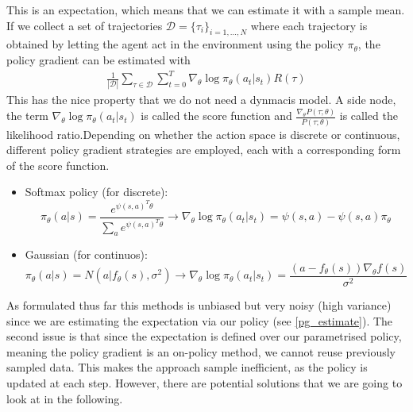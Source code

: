 This is an expectation, which means that we can estimate it with a sample mean. If we collect a set
of trajectories $\mathcal{D} = \{\tau_i\}_{i=1,...,N}$ where each trajectory is obtained by letting
the agent act in the environment using the policy $\pi_{\theta}$, the policy gradient can be estimated with
\begin{align} 
    \frac{1}{|\mathcal{D}|} \sum_{\tau \in \mathcal{D}} \sum_{t=0}^{T} \nabla_{\theta} 
    \log \pi_{\theta}(a_t |s_t) R(\tau) \label{pg_estimate}
\end{align}
This has the nice property that we do not need a dynmacis model. 
A side node, the term $\nabla_{\theta}\log{\pi_{\theta}(a_t|s_t)}$ is called 
the score function and $\frac{\nabla_{\theta} P(\tau;\theta)}{P(\tau;\theta)}$ 
is called the likelihood ratio.\newline Depending on whether the action space is discrete or continuous,
different policy gradient strategies are employed, each with a corresponding form of the score function.
\begin{itemize}
    \item Softmax policy (for discrete): 
    $$\pi_{\theta}(a|s)= \frac{e^{\psi(s,a)^T \theta}}{\sum_{a} e^{\psi(s,a)^T \theta}} \rightarrow 
    \nabla_{\theta}\log{\pi_{\theta}(a_t|s_t)} = \psi(s,a)- \psi(s,a) \pi_{\theta}$$
    \item Gaussian (for continuos): 
    $$\pi_{\theta}(a|s)= N(a|f_{\theta}(s),\sigma^2) \rightarrow
    \nabla_{\theta}\log{\pi_{\theta}(a_t|s_t)} = \frac{(a-f_{\theta}(s))\nabla_{\theta}f(s)}{\sigma^2}$$
\end{itemize}
As formulated thus far this methods is unbiased but very noisy (high variance) since we are 
estimating the expectation via our policy (see \ref{pg_estimate}). The second issue is that since 
the expectation is defined over our parametrised policy, meaning the policy gradient is an 
on-policy method, we cannot reuse previously sampled data. This makes the approach sample 
inefficient, as the policy is updated at each step. However, there are potential solutions 
that we are going to look at in the following.

